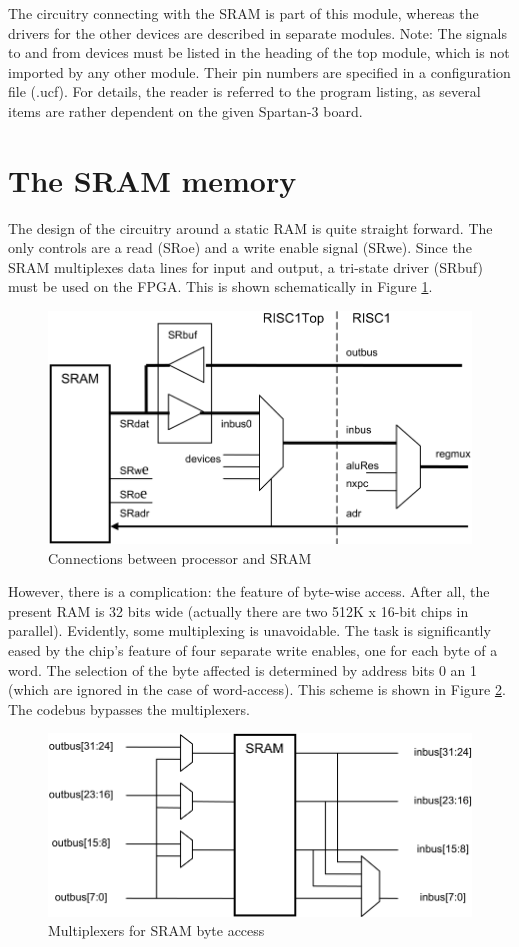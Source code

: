 The circuitry connecting with the SRAM is part of this module, whereas the drivers for the other
devices are described in separate modules. Note: The signals to and from devices must be listed in
the heading of the top module, which is not imported by any other module. Their pin numbers are
specified in a configuration file (.ucf). For details, the reader is referred to the program listing, as
several items are rather dependent on the given Spartan-3 board.

\section{The SRAM memory}
The design of the circuitry around a static RAM is quite straight forward. The only controls are a
read (SRoe) and a write enable signal (SRwe). Since the SRAM multiplexes data lines for input and
output, a tri-state driver (SRbuf) must be used on the FPGA. This is shown schematically in Figure \ref{fig:conn}.
\begin{figure}[h!]
  \centering
  \includegraphics[width=\textwidth]{i/G/1.png}
  \caption{Connections between processor and SRAM}
  \label{fig:conn}
\end{figure}

However, there is a complication: the feature of byte-wise access. After all, the present RAM is 32
bits wide (actually there are two 512K x 16-bit chips in parallel). Evidently, some multiplexing is
unavoidable. The task is significantly eased by the chip's feature of four separate write enables,
one for each byte of a word. The selection of the byte affected is determined by address bits 0 an 1
(which are ignored in the case of word-access). This scheme is shown in Figure \ref{fig:sram}. The
codebus bypasses the multiplexers.
\begin{figure}[h!]
  \centering
  \includegraphics[width=.9\textwidth]{i/G/2.png}
  \caption{Multiplexers for SRAM byte access}
  \label{fig:sram}
\end{figure}

